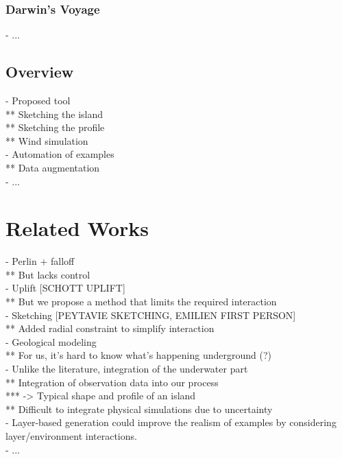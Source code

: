 \subsubsection{Darwin's Voyage}
- ...

\subsection{Overview}
- Proposed tool \\
** Sketching the island \\
** Sketching the profile \\
** Wind simulation \\
- Automation of examples \\
** Data augmentation \\
- ...

\section{Related Works}
\label{sec:coral-island_related-works}
- Perlin + falloff \\
** But lacks control \\
- Uplift [SCHOTT UPLIFT] \cite{Cordonnier2016,Cordonnier2017a} \\
** But we propose a method that limits the required interaction \\
- Sketching [PEYTAVIE SKETCHING, EMILIEN FIRST PERSON] \cite{Gain2009} \\
** Added radial constraint to simplify interaction \\
- Geological modeling \cite{Patel2021} \\
** For us, it's hard to know what’s happening underground (?) \\
- Unlike the literature, integration of the underwater part \\
** Integration of observation data into our process \\
*** -> Typical shape and profile of an island \\
** Difficult to integrate physical simulations due to uncertainty \\
- Layer-based generation could improve the realism of examples by considering layer/environment interactions. \\
- ...

